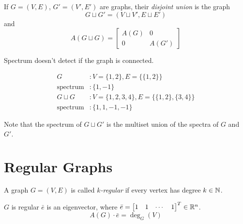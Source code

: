 \begin{definition}
If \(G=(V,E)\), \(G'=(V',E')\) are graphs, their \emph{disjoint union} is the graph
\[ G\sqcup G'=(V\sqcup V', E\sqcup E') \]
and
\[ A(G\sqcup G)=\begin{bmatrix} A(G) & 0 \\ 0 & A(G') \end{bmatrix} \]
\end{definition}
\begin{remark}
Spectrum doesn't detect if the graph is connected.
\end{remark}
\begin{example}
\begin{align*}
G&: V=\{1,2\}, E=\{\{1,2\}\}\\
\text{spectrum}&: \{1,-1\}\\
G\sqcup G&: V=\{1,2,3,4\}, E=\{\{1,2\},\{3,4\}\}\\
\text{spectrum}&: \{1,1,-1,-1\}
\end{align*}
\end{example}

\begin{remark}
Note that the spectrum of \(G\sqcup G'\) is the multiset union of the spectra of \(G\) and \(G'\).
\end{remark}


\section{Regular Graphs}
\begin{definition}
A graph \(G=(V,E)\) is called \emph{\(k\)-regular} if every vertex has degree \(k\in\mathbb{N}\).
\end{definition}
\begin{remark}
\(G\) is regular \iff \(\bar e\) is an eigenvector, where \(\bar e=\begin{bmatrix} 1 & 1 & \cdots & 1 \end{bmatrix}^T\in\mathbb{R}^n \).
\[ A(G)\cdot\bar e=\deg_G(V) \]
\end{remark}

